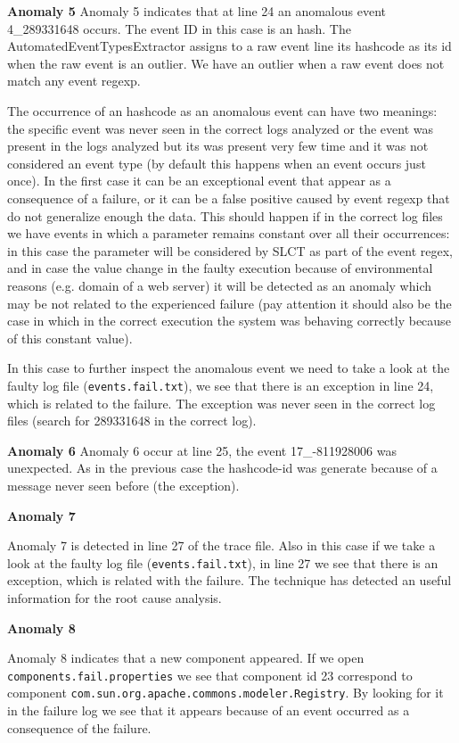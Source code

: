 \textbf{Anomaly 5} 
Anomaly 5 indicates that at line 24 an anomalous event 4\_289331648
occurs. The event ID in this case is an hash. The
AutomatedEventTypesExtractor assigns to a raw event line its hashcode
as its id when the raw event is an outlier. We have an outlier when a
raw event does not match any event regexp. 

The occurrence of an
hashcode as an anomalous event can have two meanings: the specific
event
was never seen in the correct logs analyzed or the event was
present in the logs analyzed but its was present very few time and it
was not considered an event type (by default this happens when an
event occurs just once). In the first case it can be an exceptional
event that appear as a consequence of a failure, or it can be a false
positive caused by event regexp that do not generalize enough the
data. This should happen if in the correct log files we have events in
which a parameter remains constant over all their occurrences: in
this case the parameter will be considered by SLCT as part of the
event regex, and in case the value change in the faulty execution
because of environmental reasons (e.g. domain of a web server) it
will be detected as an anomaly which may be not related to the
experienced failure (pay attention it should also be the case in
which in the correct execution the system was behaving correctly
because of this constant value).

In this case to further inspect the anomalous event we need to take a
look at the faulty log
file (\texttt{events.fail.txt}), we see that there is an
exception in line 24, which is related to the failure. The exception was
never seen in the correct log files (search for 289331648 in the
correct log).


\textbf{Anomaly 6} 
Anomaly 6 occur at line 25, the event 17\_-811928006 was unexpected.
As in the previous case the hashcode-id was generate because of a
message never seen before (the exception).

\textbf{Anomaly 7} 

Anomaly 7 is detected in line 27 of the trace file. Also in this case
if we take a look at the faulty log
file (\texttt{events.fail.txt}), in line 27 we see that there is an
exception, which is related with the failure. The technique has
detected an useful information for the root cause analysis.

\textbf{Anomaly 8} 

Anomaly 8 indicates that a new component appeared. If we open
\texttt{components.\-fail.\-properties} we see that component id 23
correspond to component
\texttt{com.sun.org.\-apache.commons.\-modeler.Registry}. By
looking for
it in the failure log we see that it appears because of an event
occurred as a consequence of the failure.



